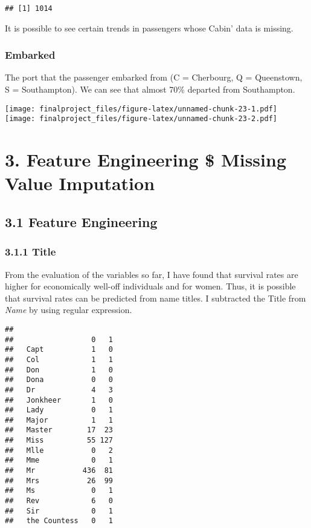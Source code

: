 \documentclass[
]{article}
\begin{document}
\begin{verbatim}
## [1] 1014
\end{verbatim}

It is possible to see certain trends in passengers whose Cabin' data is
missing.

\hypertarget{embarked}{%
\subsubsection{\texorpdfstring{\textbf{Embarked}}{Embarked}}\label{embarked}}

The port that the passenger embarked from (C = Cherbourg, Q =
Queenstown, S = Southampton). We can see that almost 70\% departed from
Southampton.

\texttt{[image: finalproject\_files/figure-latex/unnamed-chunk-23-1.pdf]}
\texttt{[image: finalproject\_files/figure-latex/unnamed-chunk-23-2.pdf]}

\hypertarget{feature-engineering-missing-value-imputation}{%
\section{\texorpdfstring{\textbf{3. Feature Engineering \$ Missing Value
Imputation}}{3. Feature Engineering \$ Missing Value Imputation}}\label{feature-engineering-missing-value-imputation}}

\hypertarget{feature-engineering}{%
\subsection{\texorpdfstring{\textbf{3.1 Feature
Engineering}}{3.1 Feature Engineering}}\label{feature-engineering}}

\hypertarget{title}{%
\subsubsection{\texorpdfstring{\textbf{3.1.1
Title}}{3.1.1 Title}}\label{title}}

From the evaluation of the variables so far, I have found that survival
rates are higher for economically well-off individuals and for women.
Thus, it is possible that survival rates can be predicted from name
titles. I subtracted the Title from \emph{Name} by using regular
expression.

\begin{verbatim}
##               
##                  0   1
##   Capt           1   0
##   Col            1   1
##   Don            1   0
##   Dona           0   0
##   Dr             4   3
##   Jonkheer       1   0
##   Lady           0   1
##   Major          1   1
##   Master        17  23
##   Miss          55 127
##   Mlle           0   2
##   Mme            0   1
##   Mr           436  81
##   Mrs           26  99
##   Ms             0   1
##   Rev            6   0
##   Sir            0   1
##   the Countess   0   1
\end{verbatim}
\end{document}

